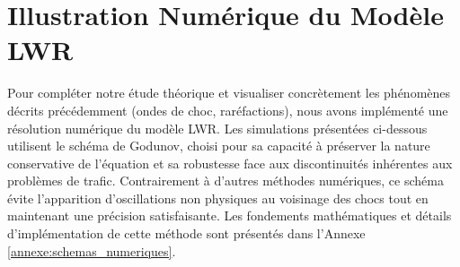 \section{Illustration Numérique du Modèle LWR}
\label{sec:illustration_numerique}

Pour compléter notre étude théorique et visualiser concrètement les phénomènes décrits précédemment (ondes de choc, raréfactions), nous avons implémenté une résolution numérique du modèle LWR. Les simulations présentées ci-dessous utilisent le schéma de Godunov, choisi pour sa capacité à préserver la nature conservative de l'équation et sa robustesse face aux discontinuités inhérentes aux problèmes de trafic. Contrairement à d'autres méthodes numériques, ce schéma évite l'apparition d'oscillations non physiques au voisinage des chocs tout en maintenant une précision satisfaisante. Les fondements mathématiques et détails d'implémentation de cette méthode sont présentés dans l'Annexe \ref{annexe:schemas_numeriques}.